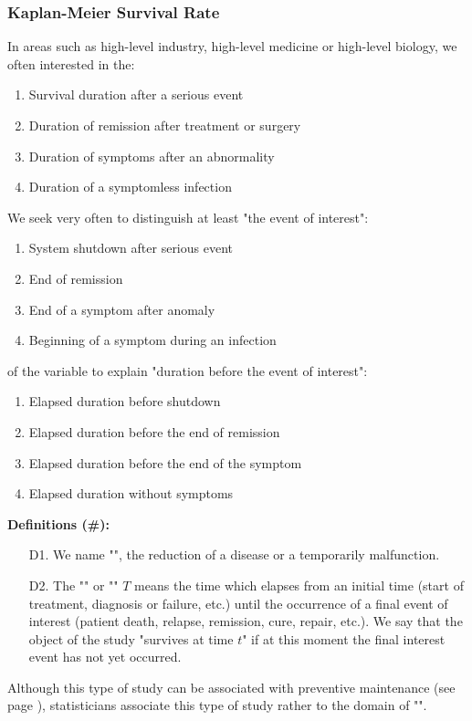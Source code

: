 	\subsubsection{Kaplan-Meier Survival Rate}
	In areas such as high-level industry, high-level medicine or high-level biology, we often interested in the:
	\begin{enumerate}
		\item Survival duration after a serious event
		\item Duration of remission after treatment or surgery
		\item Duration of symptoms after an abnormality
		\item Duration of a symptomless infection
	\end{enumerate}
	We seek very often to distinguish at least "the event of interest":
	\begin{enumerate}
		\item System shutdown after serious event
		\item End of remission 
		\item End of a symptom after anomaly
		\item Beginning of a symptom during an infection
	\end{enumerate}
	of the variable to explain "duration before the event of interest":
	\begin{enumerate}
		\item Elapsed duration before shutdown
		\item Elapsed duration before the end of remission
		\item Elapsed duration before the end of the symptom
		\item Elapsed duration without symptoms
	\end{enumerate}
	\textbf{Definitions (\#\mydef):}
	\begin{enumerate}
		\item[D1.] We name "", the reduction of a disease or a temporarily malfunction.
		
		\item[D2.] The "" or "" $T$ means the time which elapses from an initial time (start of treatment, diagnosis or failure, etc.) until the occurrence of a final event of interest (patient death, relapse, remission, cure, repair, etc.). We say that the object of the study "survives at time $t$" if at this moment the final interest event has not yet occurred.
	\end{enumerate}
	\begin{tcolorbox}[title=Remark,colframe=black,arc=10pt]
	Although this type of study can be associated with preventive maintenance (see page \pageref{preventive maintenance}), statisticians associate this type of study rather to the domain of "".
	\end{tcolorbox}
	
